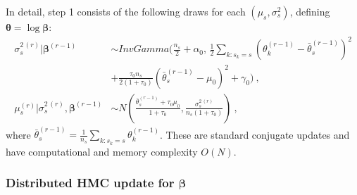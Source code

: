 \documentclass[12pt]{article}
\begin{document}
In detail, step 1 consists of the following draws for each $(\mu_s, \sigma^2_s)$, defining $\bm \theta = \log \bm \beta$:
\begin{align}
 \sigma_s^{2\,(r)} | \bm \beta^{(r-1)} &\sim InvGamma{\bigg(}\frac{n_s}{2} + \alpha_0,
  \, \frac{1}{2} \sum_{k:s_k = s} (\theta_k^{(r-1)} - \bar{\theta}_s^{(r-1)})^2  \\
\nonumber
  & + \frac{\tau_0 n_s}{2 (1 + \tau_0)} (\bar{\theta}_s^{(r-1)} - \mu_0)^2
  + \gamma_0 {\bigg)} \ , \\
 \mu_s^{(r)} | \sigma_s^{2\,(r)}, \bm \beta^{(r-1)} &\sim N\left( \frac{\bar{\theta}_s^{(r-1)} + \tau_0 \mu_0}{1 + \tau_0}, \frac{\sigma_s^{2\,(r)}}{n_s (1 + \tau_0)} \right) \ ,
\end{align}
where $\bar{\theta}_s^{(r-1)} = \frac{1}{n_s} \sum_{k : s_k = s} \theta_k^{(r-1)}$.
These are standard conjugate updates and have computational and memory complexity $O(N)$.

\subsubsection{Distributed HMC update for \texorpdfstring{$\bm \beta$}{beta}}
\label{sec:distributedHMC}
\end{document}
